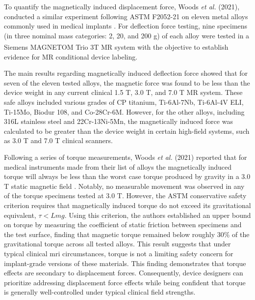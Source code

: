 To quantify the magnetically induced displacement force, Woods \textit{et al.} (2021), conducted a similar experiment following ASTM F2052-21 on eleven metal alloys commonly used in medical implants \cite{Woods2021_MRIdisplacement}. For deflection force testing, nine specimens (in three nominal mass categories: 2, 20, and 200 g) of each alloy were tested in a Siemens MAGNETOM Trio\textsuperscript{\texttrademark} 3T MR system with the objective to establish evidence for MR conditional device labeling.

The main results regarding magnetically induced deflection force showed that for seven of the eleven tested alloys, the magnetic force was found to be less than the device weight in any current clinical 1.5 T, 3.0 T, and 7.0 T MR system. These safe alloys included various grades of CP titanium, Ti-6Al-7Nb, Ti-6Al-4V ELI, Ti-15Mo, Biodur 108, and Co-28Cr-6M. However, for the other alloys, including 316L stainless steel and 22Cr-13Ni-5Mn, the magnetically induced force was calculated to be greater than the device weight in certain high-field systems, such as 3.0 T and 7.0 T clinical scanners.



Following a series of torque measurements, Woods \textit{et al.} (2021) reported that for medical instruments made from their list of alloys the magnetically induced torque will always be less than the worst case torque produced by gravity in a 3.0 T static magnetic field \cite{Woods2021_MRIdisplacement}. Notably, no measurable movement was observed in any of the torque specimens tested at 3.0 T. However, the ASTM conservative safety criterion requires that magnetically induced torque do not exceed its gravitational equivalent, $\tau < Lmg$. Using this criterion, the authors established an upper bound on torque by measuring the coefficient of static friction between specimens and the test surface, finding that magnetic torque remained below roughly 30\% of the gravitational torque across all tested alloys. This result suggests that under typical clinical \gls{mri} circumstances, torque is not a limiting safety concern for implant-grade versions of these materials. This finding demonstrates that torque effects are secondary to displacement forces. Consequently, device designers can prioritize addressing displacement force effects while being confident that torque is generally well-controlled under typical clinical field strengths.

